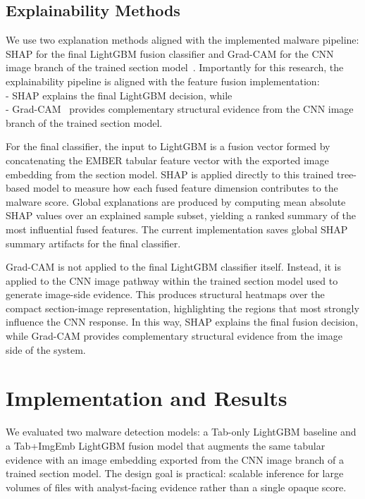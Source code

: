 \documentclass[conference]{IEEEtran}
\begin{document}
\subsection{Explainability Methods}

We use two explanation methods aligned with the implemented malware pipeline: SHAP for the final LightGBM fusion classifier and Grad-CAM for the CNN image branch of the trained section model~\cite{LL2017,SCDVPB2017}.
Importantly for this research, the explainability pipeline is aligned with the feature fusion implementation:\\
- SHAP explains the final LightGBM decision, while\\
- Grad-CAM~\cite{LL2017,SCDVPB2017} provides complementary structural evidence from the CNN image branch of the trained section model.

For the final classifier, the input to LightGBM is a fusion vector formed by concatenating the EMBER tabular feature vector with the exported image embedding from the section model.
SHAP is applied directly to this trained tree-based model to measure how each fused feature dimension contributes to the malware score.
Global explanations are produced by computing mean absolute SHAP values over an explained sample subset, yielding a ranked summary of the most influential fused features.
The current implementation saves global SHAP summary artifacts for the final classifier.

Grad-CAM is not applied to the final LightGBM classifier itself.
Instead, it is applied to the CNN image pathway within the trained section model used to generate image-side evidence.
This produces structural heatmaps over the compact section-image representation, highlighting the regions that most strongly influence the CNN response.
In this way, SHAP explains the final fusion decision, while Grad-CAM provides complementary structural evidence from the image side of the system.


\section{Implementation and Results}
\label{section:implementation-and-results}


We evaluated two malware detection models: a Tab-only LightGBM baseline and a Tab+ImgEmb LightGBM fusion model that augments the same tabular evidence with an image embedding exported from the CNN image branch of a trained section model.
The design goal is practical: scalable inference for large volumes of files with analyst-facing evidence rather than a single opaque score.
\end{document}
